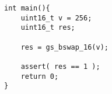 \begin{minipage}{14cm}
\begin{lstlisting}[style=CStyle, caption=Example of test case for function \emph{gs\_bswap\_16} derived from KLEE output., label=GSLaugmentationTest_klee]
int main(){
    uint16_t v = 256;                                                                                                                                  
    uint16_t res;

    res = gs_bswap_16(v);

    assert( res == 1 );
    return 0;
}
\end{lstlisting}
\end{minipage}
